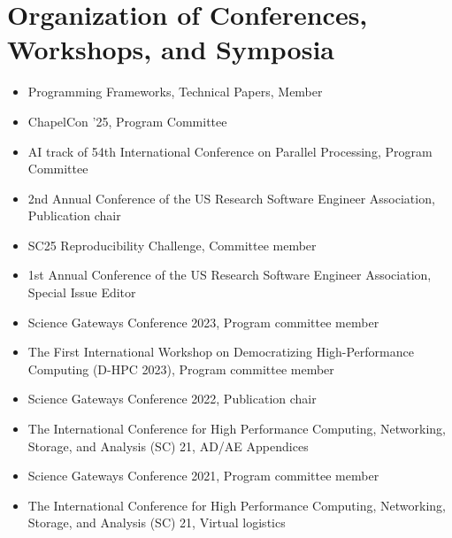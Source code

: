 \documentclass[11pt,a4paper,sans]{moderncv}
\begin{document}
\section{Organization of Conferences, Workshops, and Symposia}
\begin{itemize}[leftmargin=4cm]
\item Programming Frameworks, Technical Papers, Member
\item ChapelCon '25, Program Committee
\item AI track of 54th International Conference on Parallel Processing, Program Committee
\item 2nd Annual Conference of the US Research Software Engineer Association, Publication chair
\item SC25 Reproducibility Challenge, Committee member
\item 1st Annual Conference of the US Research Software Engineer Association, Special Issue Editor
\item Science Gateways Conference 2023, Program committee member
\item The First International Workshop on
Democratizing High-Performance Computing (D-HPC 2023), Program committee member
\item Science Gateways Conference 2022, Publication chair
\item The International Conference for High Performance Computing, Networking, Storage, and Analysis (SC) 21, AD/AE Appendices
\item Science Gateways Conference 2021, Program committee member
\item The International Conference for High Performance Computing, Networking, Storage, and Analysis (SC) 21, Virtual logistics
\end{itemize}
\end{document}
